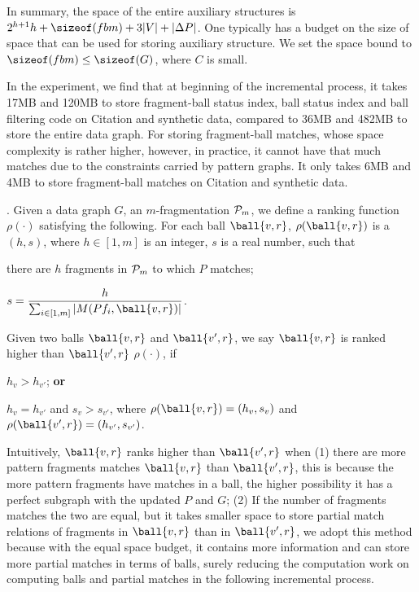 In summary, the space of the entire auxiliary structures is $2^{h+1}h+ \sizeof(fbm)+3|V|+|\Delta P|$.  One typically has a budget on the size of space that can be used for storing auxiliary structure. We set the space bound to $\sizeof(fbm)\le \sizeof(G)$, where $C$ is small.

In the experiment, we find that at beginning of the incremental process, it takes 17MB and 120MB to store fragment-ball status index, ball status index and ball filtering code on Citation and synthetic data, compared to 36MB and 482MB to store the entire data graph. For storing fragment-ball matches, whose space complexity is rather higher, however, in practice, it cannot have that much matches due to the constraints carried by pattern graphs. It only takes 6MB and 4MB to store fragment-ball matches on Citation and synthetic data.

.
Given a data graph $G$, an $m$-fragmentation ${\cal P}_m$, we define a ranking function $\rho(\cdot)$ satisfying the following.
For each ball $\ball{v,r}$, $\rho(\ball{v,r})$ is a $(h, s)$, where $h\in [1, m]$ is an integer, $s$ is a real number, such that
\bi
\item [(i)] there are $h$ fragments in ${\cal P}_m$ to which $P$ matches;
\item [(ii)] $s = \dfrac{h}{\sum_{i\in [1,m]} |M(Pf_i, \ball{v,r})|}$.
\ei

Given two balls $\ball{v,r}$ and $\ball{v',r}$, we say $\ball{v,r}$ is ranked higher than $\ball{v',r}$ \wrt $\rho(\cdot)$, if
\bi
\item [(1)] $h_v > h_{v'}$; {\bf or}
\item [(2)] $h_v = h_{v'}$ and $s_v > s_{v'}$,
\ei
where $\rho(\ball{v,r}) = (h_v, s_v)$ and $\rho(\ball{v',r}) = (h_{v'}, s_{v'})$.

Intuitively, $\ball{v,r}$ ranks higher than $\ball{v', r}$ when (1) there are more pattern fragments matches $\ball{v,r}$ than $\ball{v',r}$, this is because the more pattern fragments have matches in a ball, the higher possibility it has a perfect subgraph with the updated $P$ and $G$; (2) If the number of fragments matches the two are equal, but it takes smaller space to store partial match relations of fragments in $\ball{v,r}$ than in $\ball{v',r}$, we adopt this method because with the equal space budget, it contains more information and can store more partial matches in terms of balls, surely reducing the computation work on computing balls and partial matches in the following incremental process.
